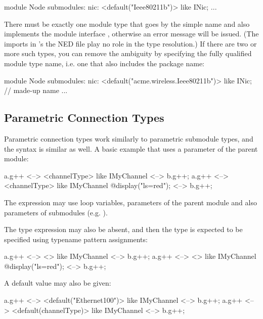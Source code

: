 \begin{ned}
module Node
{
    submodules:
        nic: <default("Ieee80211b")> like INic;
        ...
}
\end{ned}

There must be exactly one module type that goes by the simple name 
and also implements the module interface , otherwise an error message
will be issued. (The imports in 's the NED file play no role in the
type resolution.)  If there are two or more such types, you can remove the ambiguity
by specifying the fully qualified module type name, i.e. one that also includes
the package name:

\begin{ned}
module Node
{
    submodules:
        nic: <default("acme.wireless.Ieee80211b")> like INic; // made-up name
        ...
}
\end{ned}





\subsection{Parametric Connection Types}
\label{sec:ned-lang:connection-like}

Parametric connection types work similarly to parametric submodule types,
and the syntax is similar as well. A basic example that uses a parameter of
the parent module:

\begin{ned}
a.g++ <--> <channelType> like IMyChannel <--> b.g++;
a.g++ <--> <channelType> like IMyChannel {@display("ls=red");} <--> b.g++;
\end{ned}

The expression may use loop variables, parameters of the parent module
and also parameters of submodules (e.g. ).

The type expression may also be absent, and then the type is expected to be
specified using typename pattern assignments:

\begin{ned}
a.g++ <--> <> like IMyChannel <--> b.g++;
a.g++ <--> <> like IMyChannel {@display("ls=red");} <--> b.g++;
\end{ned}

A default value may also be given:

\begin{ned}
a.g++ <--> <default("Ethernet100")> like IMyChannel <--> b.g++;
a.g++ <--> <default(channelType)> like IMyChannel <--> b.g++;
\end{ned}

